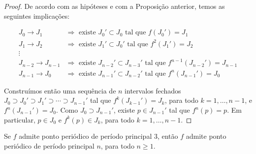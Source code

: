 \begin{proof}
De acordo com as hipóteses e com a Proposição anterior, temos as seguintes implicações:

\begin{align*}
J_0 \longrightarrow J_1 & \Rightarrow \textrm{ existe } J_0' \subset J_0 \textrm{ tal que } f(J_0') = J_1 \\
J_1 \longrightarrow J_2 & \Rightarrow \textrm{ existe } J_1' \subset J_0' \textrm{ tal que } f^2(J_1') = J_2 \\
\vdots \\
J_{n-2} \longrightarrow J_{n-1} & \Rightarrow \textrm{ existe } J_{n-2}' \subset J_{n-3}' \textrm{ tal que } f^{n-1}(J_{n-2}') = J_{n-1} \\
J_{n-1} \longrightarrow J_0 & \Rightarrow \textrm{ existe } J_{n-1}' \subset J_{n-2}' \textrm{ tal que } f^n(J_{n-1}') = J_0 
\end{align*}


Construímos então uma sequência de $n$ intervalos fechados $J_0 \supset J_0' \supset J_1' \supset \cdots \supset J_{n-1}'$ tal que $f^k(J_{k-1}') = J_k$, para todo $k = 1, \dots, n-1$, e $f^n(J_{n-1}') = J_0$. Como $J_0 \supset J_{n-1}'$, existe $p \in J_{n-1}'$ tal que $f^n(p) = p$. Em particular, $p \in J_0$ e $f^k(p) \in J_k$, para todo $k = 1, \dots, n-1$. 
\end{proof}

\begin{theorem}
Se $f$ admite ponto periódico de período principal $3$, então $f$ admite ponto periódico de período principal $n$, para todo $n \geq 1$.
\end{theorem}

